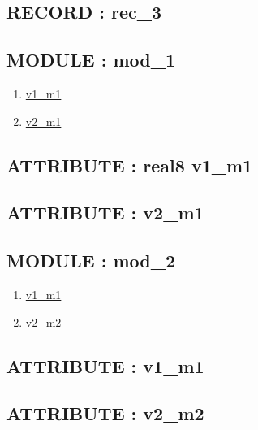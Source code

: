 \subsection*{RECORD : rec\_3}
\hypertarget{ecldoc:intest.example_2_intest.example_2.rec_3}{}
\subsection*{MODULE : mod\_1}
\hypertarget{ecldoc:intest.example_2_intest.example_2.mod_1}{}
\begin{enumerate}
\item \hyperlink{ecldoc:intest.example_2_intest.example_2.mod_1.v1_m1}{v1\_m1}
\item \hyperlink{ecldoc:intest.example_2_intest.example_2.mod_1.v2_m1}{v2\_m1}
\end{enumerate}
\subsection*{ATTRIBUTE : real8 v1\_m1}
\hypertarget{ecldoc:intest.example_2_intest.example_2.mod_1.v1_m1}{}
\subsection*{ATTRIBUTE : v2\_m1}
\hypertarget{ecldoc:intest.example_2_intest.example_2.mod_1.v2_m1}{}

\subsection*{MODULE : mod\_2}
\hypertarget{ecldoc:intest.example_2_intest.example_2.mod_2}{}
\begin{enumerate}
\item \hyperlink{ecldoc:intest.example_2_intest.example_2.mod_2.v1_m1}{v1\_m1}
\item \hyperlink{ecldoc:intest.example_2_intest.example_2.mod_2.v2_m2}{v2\_m2}
\end{enumerate}
\subsection*{ATTRIBUTE : v1\_m1}
\hypertarget{ecldoc:intest.example_2_intest.example_2.mod_2.v1_m1}{}
\subsection*{ATTRIBUTE : v2\_m2}
\hypertarget{ecldoc:intest.example_2_intest.example_2.mod_2.v2_m2}{}

